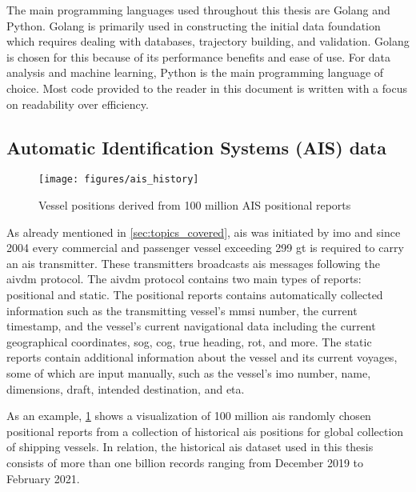 The main programming languages used throughout this thesis are Golang and Python. Golang is primarily used in constructing the initial data foundation which requires dealing with databases, trajectory building, and validation. Golang is chosen for this because of its performance benefits and ease of use. For data analysis and machine learning, Python is the main programming language of choice. Most code provided to the reader in this document is written with a focus on readability over efficiency.

\subsection{Automatic Identification Systems (AIS) data}
\label{sec:ais_data}

\begin{figure}[htbp]  %
    \centering
    \texttt{[image: figures/ais\_history]}
    \caption{Vessel positions derived from 100 million AIS positional reports}
    \label{fig:ais_positions}
\end{figure}

As already mentioned in \cref{sec:topics_covered}, \acrfull{ais} was initiated by \acrfull{imo} and since 2004 every commercial and passenger vessel exceeding 299 \acrfull{gt} is required to carry an \acrshort{ais} transmitter. These transmitters broadcasts \acrshort{ais} messages following the \gls{aivdm} protocol. The \gls{aivdm} protocol contains two main types of reports: positional and static. The positional reports contains automatically collected information such as the transmitting vessel's \acrfull{mmsi} number, the current timestamp, and the vessel's current navigational data including the current geographical coordinates, \acrfull{sog}, \acrfull{cog}, true heading, \acrfull{rot}, and more. The static reports contain additional information about the vessel and its current voyages, some of which are input manually, such as the vessel's \acrshort{imo} number, name, dimensions, draft, intended destination, and \acrfull{eta}.

As an example, \cref{fig:ais_positions} shows a visualization of 100 million \acrshort{ais} randomly chosen positional reports from a collection of historical \acrshort{ais} positions for global collection of shipping vessels. In relation, the historical \acrshort{ais} dataset used in this thesis consists of more than one billion records ranging from December 2019 to February 2021.

